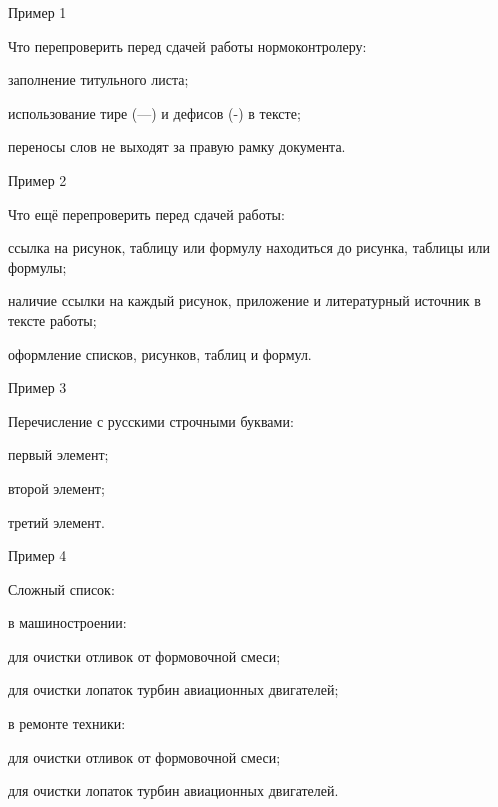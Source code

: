 \documentclass{report}
\begin{document}
Пример 1

Что перепроверить перед сдачей работы нормоконтролеру:
\begin{enummarker}
\item заполнение титульного листа;
\item использование тире (---) и дефисов (-) в тексте;
\item переносы слов не выходят за правую рамку документа. 
\end{enummarker}

Пример 2

Что ещё перепроверить перед сдачей работы:
\begin{enumarabic}
  \item ссылка на рисунок, таблицу или формулу находиться до рисунка, таблицы или формулы;
  \item наличие ссылки на каждый рисунок, приложение и литературный источник в тексте работы;
  \item оформление списков, рисунков, таблиц и формул.
\end{enumarabic}

\hfill\break %
\hfill\break
\hfill\break

Пример 3

Перечисление с русскими строчными буквами:
\begin{enumasbuk}
  \item первый элемент;
  \item второй элемент;
  \item третий элемент.
\end{enumasbuk}

Пример 4

Сложный список:

\begin{enummarker}
  \item в машиностроении:
    \begin{enumarabic}
        \item для очистки отливок от формовочной смеси;
        \item для очистки лопаток турбин авиационных двигателей;   
    \end{enumarabic}
  \item в ремонте техники:
    \begin{enumarabic}
        \item для очистки отливок от формовочной смеси;
        \item для очистки лопаток турбин авиационных двигателей.  
    \end{enumarabic}
\end{enummarker}
\end{document}
